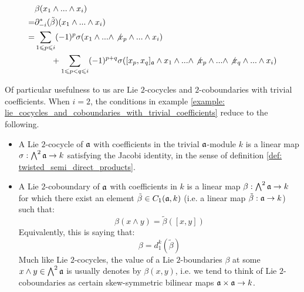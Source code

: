 \begin{example}
\begin{itemize}
$$\begin{aligned}
                            & \beta(x_1 \wedge ... \wedge x_i)
                            \\
                            = & \partial_{-i}^*(\tilde{\beta})(x_1 \wedge ... \wedge x_i)
                            \\
                            = &
                                \sum_{1 \leqslant p \leqslant i} (-1)^p \sigma(x_1 \wedge ... \wedge \not{x_p} \wedge ... \wedge x_i)
                                \\
                                & \qquad + \sum_{1 \leqslant p < q \leqslant i} (-1)^{p + q} \sigma( [x_p, x_q]_{\mathfrak{a}} \wedge x_1 \wedge ... \wedge \not{x_p} \wedge ... \wedge \not{x_q} \wedge ... \wedge x_i)
                        \end{aligned}
                    $$
            \end{itemize}
        \end{example}
        \begin{example} \label{example: low_degree_lie_cocycles_and_coboundaries_with_trivial_coefficients}
            Of particular usefulness to us are Lie $2$-cocycles and $2$-coboundaries with trivial coefficients. When $i = 2$, the conditions in example \ref{example: lie_cocycles_and_coboundaries_with_trivial_coefficients} reduce to the following.
            \begin{itemize}
                \item A Lie $2$-cocycle of $\mathfrak{a}$ with coefficients in the trivial $\mathfrak{a}$-module $k$ is a linear map $\sigma: \bigwedge^2 \mathfrak{a} \to k$ satisfying the Jacobi identity, in the sense of definition \ref{def: twisted_semi_direct_products}.
                \item A Lie $2$-coboundary of $\mathfrak{a}$ with coefficients in $k$ is a linear map $\beta: \bigwedge^2 \mathfrak{a} \to k$ for which there exist an element $\tilde{\beta} \in C_1(\mathfrak{a}, k)$ (i.e. a linear map $\tilde{\beta}: \mathfrak{a} \to k$) such that:
                    $$\beta(x \wedge y) = \tilde{\beta}([x, y])$$
                Equivalently, this is saying that:
                    $$\beta = d_1^k(\tilde{\beta})$$
                Much like Lie $2$-cocycles, the value of a Lie $2$-boundaries $\beta$ at some $x \wedge y \in \bigwedge^2 \mathfrak{a}$ is usually denotes by $\beta(x, y)$, i.e. we tend to think of Lie $2$-coboundaries as certain skew-symmetric bilinear maps $\a \x \a \to k$.
            \end{itemize}
        \end{example}

